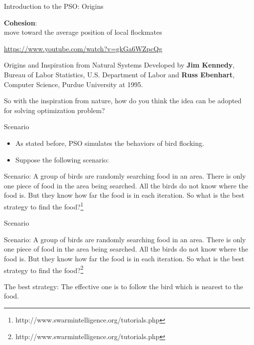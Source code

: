 \documentclass[pdflatex,compress,mathserif]{beamer}
\begin{document}
\begin{frame}{Introduction to the PSO: Origins}
\begin{multicols}{3}
		\scriptsize{\textbf{Cohesion}:\\
			move toward the average position of local flockmates}
		\vfill\null
	\end{multicols}
	\centering \href{https://www.youtube.com/watch?v=gkGa6WZpcQg}{\footnotesize{https://www.youtube.com/watch?v=gkGa6WZpcQg}}
\end{frame}

\begin{frame}{Origins and Inspiration from Natural Systems}
	Developed by \textbf{Jim Kennedy}, Bureau of Labor Statistics, U.S. Department of Labor and \textbf{Russ Ebenhart}, Computer Science, Purdue University at 1995.
\end{frame}

\begin{frame}
	\Large{So with the inspiration from nature, how do you think the idea can be adopted for solving optimization problem?}
\end{frame}

\begin{frame}{Scenario}
	\begin{itemize}
		\item As stated before, PSO simulates the behaviors of bird flocking.
		\item Suppose the following scenario:
	\end{itemize}
	\begin{exampleblock}{Scenario:}
		A group of birds are randomly searching food in an area. There is only one piece of food in the area being searched. All the birds do not know where the food is. But they know how far the food is in each iteration. So what is the best strategy to find the food?\footnote{http://www.swarmintelligence.org/tutorials.php}
	\end{exampleblock}
\end{frame}

\begin{frame}{Scenario}
	\begin{exampleblock}{Scenario:}
		A group of birds are randomly searching food in an area. There is only one piece of food in the area being searched. All the birds do not know where the food is. But they know how far the food is in each iteration. So what is the best strategy to find the food?\footnote{http://www.swarmintelligence.org/tutorials.php}
	\end{exampleblock}
	\begin{alertblock}{The best strategy:}
		The effective one is to follow the bird which is nearest to the food.
	\end{alertblock}
\end{frame}
\end{document}
